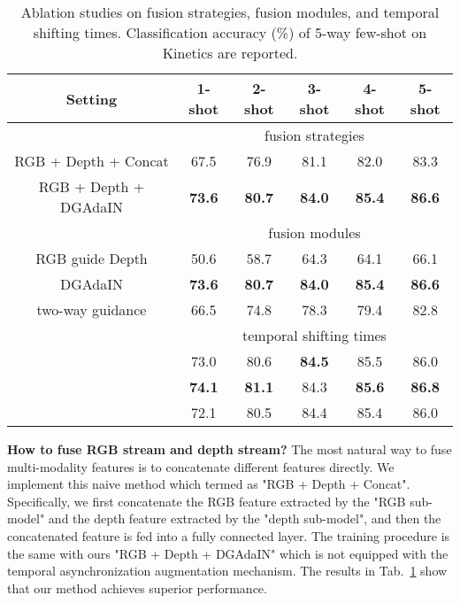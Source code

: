 \documentclass[sigconf]{acmart}
\begin{document}
	
	\begin{table}\small
		\begin{centering}
			\caption{Ablation studies on fusion strategies, fusion modules, and temporal shifting times. 
				Classification accuracy (\%)  of 5-way few-shot on Kinetics are reported.
				\label{tab:abalation}}
			\begin{tabular}{c|c|c|c|c|c}
				\hline
				Setting & 1-shot  & 2-shot  & 3-shot  & 4-shot  & 5-shot \tabularnewline
				\hline 
				\hline 
				&  \multicolumn{5}{c}{fusion strategies}  \tabularnewline
				\hline
				RGB +  Depth + Concat &  67.5  &  76.9 & 81.1 &  82.0 &   83.3 \tabularnewline	
				\hline
				\cline{2-6} 
				RGB + Depth + DGAdaIN &  \textbf{73.6}  & \textbf{80.7}  & \textbf{84.0} & \textbf{85.4} &  \textbf{86.6}  \tabularnewline
				\hline 
				\hline
				& \multicolumn{5}{c}{fusion modules}  \tabularnewline
				\hline 
				RGB guide Depth & 50.6  & 58.7  & 64.3  & 64.1   & 66.1 \tabularnewline
				\cline{2-6}
				\hline
				DGAdaIN & \textbf{73.6}  & \textbf{80.7}  & \textbf{84.0}  & \textbf{85.4}   & \textbf{86.6} \tabularnewline
				\cline{2-6}
				\hline
				two-way guidance  & 66.5  & 74.8  & 78.3  & 79.4  & 82.8 \tabularnewline
				\cline{2-6}
				\hline
				\hline
				& \multicolumn{5}{c}{temporal shifting times}  \tabularnewline
				\hline
				 & 73.0  & 80.6  & \textbf{84.5} & 85.5  & 86.0 \tabularnewline
				\cline{2-6}
				\hline
				 & \textbf{74.1}  & \textbf{81.1}  & 84.3  & \textbf{85.6}   & \textbf{86.8} \tabularnewline
				\cline{2-6}
				\hline
				 & 72.1  & 80.5 & 84.4  & 85.4  & 86.0 \tabularnewline
				\hline
				\hline
			\end{tabular}
			\par\end{centering}
	\end{table}
	
	
	
	\noindent\textbf{How to fuse RGB stream and depth stream?} The most natural way to fuse multi-modality features is to concatenate different features directly. 
	We implement this naive method which termed as "RGB + Depth + Concat". 
	Specifically, we first concatenate the RGB feature extracted by the "RGB sub-model" and the depth feature extracted by the "depth sub-model", and then the concatenated feature is fed into a fully connected layer. 
	The training procedure is the same with ours "RGB + Depth + DGAdaIN" which is not equipped with the temporal asynchronization augmentation mechanism. 
	The results in Tab.~\ref{tab:abalation} show that our method achieves superior performance.
	
\end{document}
